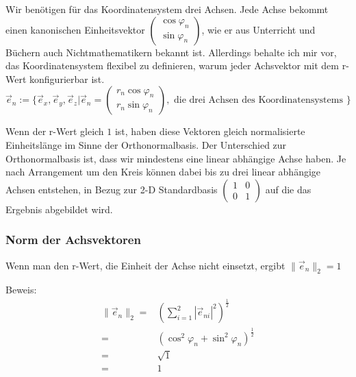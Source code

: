 \documentclass[a4paper]{article}
\begin{document}
Wir ben\"otigen f\"ur das Koordinatensystem drei Achsen. Jede Achse bekommt einen kanonischen Einheitsvektor $\begin{pmatrix}\cos\varphi_n\\\sin\varphi_n\end{pmatrix}$, wie er aus Unterricht und B\"uchern auch Nichtmathematikern bekannt ist. Allerdings behalte ich mir vor, das Koordinatensystem flexibel zu definieren, warum jeder Achsvektor mit dem r-Wert konfigurierbar ist.\\

\begin{displaymath}
\vec{e}_n := \{ \vec{e}_x, \vec{e}_y, \vec{e}_z | \vec{e}_n = \begin{pmatrix}r_n \cos \varphi_n\\r_n \sin \varphi_n\end{pmatrix}, \mbox{ die drei Achsen des Koordinatensystems }\}
\end{displaymath}

Wenn der r-Wert gleich $1$ ist, haben diese Vektoren gleich normalisierte Einheitsl\"ange im Sinne der Orthonormalbasis. Der Unterschied zur Orthonormalbasis ist, dass wir mindestens eine linear abh\"angige Achse haben. Je nach Arrangement um den Kreis k\"onnen dabei bis zu drei linear abh\"angige Achsen entstehen, in Bezug zur 2-D Standardbasis $\begin{pmatrix}1&0\\0&1\end{pmatrix}$ auf die das Ergebnis abgebildet wird.\\

\subsubsection{Norm der Achsvektoren}
\label{Norm_Achsvektoren}

Wenn man den r-Wert, die Einheit der Achse nicht einsetzt, ergibt $\|\vec{e}_n\|_2 = 1$

Beweis:\\
\begin{displaymath}
\begin{align}
    \|\vec{e}_n\|_2 =& (\sum_{i=1}^{2}|\vec{e}_{ni}|^2)^{\frac12} \\
    =&  (\cos^{2}\varphi_n + \sin^{2}\varphi_n)^{\frac12}\\
    =& \sqrt{1}\\
    =& 1
\end{align}
\end{displaymath}
\end{document}
